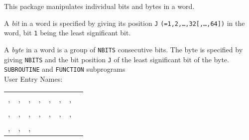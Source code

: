                    
       
\Submitter{}                        
     
This package manipulates individual bits and bytes in a word.
\par
A {\it bit} in a word is specified by giving its position {\tt J}
\texttt{(=1,2,\ldots,32[,\ldots,64])} in the word,
bit {\tt 1} being the least significant bit.
\par
A {\it byte} in a word is a group of {\tt NBITS} consecutive bits.
The byte is specified by giving {\tt NBITS} and the bit position {\tt J}
of the least significant bit of the byte.
\Structure
{\tt SUBROUTINE} and {\tt FUNCTION} subprograms \\
User Entry Names:
\begin{tabular}[t]{l*{7}{@{\hspace{4pt}}l}}
,   & ,  & ,  & ,   &
, & , & ,  \\
,   & ,   & ,  & ,   &
,  & , & , \\
, & , & , & 
\end{tabular}
\Usage
{}
